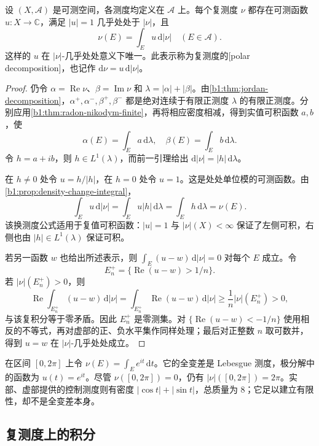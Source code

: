 \begin{theorem}[复测度的极分解]\label{b1:thm:complex-polar-decomposition}
设 \((X,\mathcal A)\) 是可测空间，各测度均定义在 \(\mathcal A\) 上。每个复测度 \(\nu\) 都存在可测函数 \(u:X\rightarrow\mathbb C\)，满足 \(|u|=1\) 几乎处处于 \(|\nu|\)，且
\[
\nu(E)=\int_Eu\,\mathrm d|\nu|\quad(E\in\mathcal A).
\]
这样的 \(u\) 在 \(|\nu|\)-几乎处处意义下唯一。此表示称为复测度的[polar decomposition]，也记作 \(\mathrm d\nu=u\,\mathrm d|\nu|\)。
\end{theorem}
\begin{proof}
仍令 \(\alpha=\operatorname{Re}\nu\)、\(\beta=\operatorname{Im}\nu\) 和 \(\lambda=|\alpha|+|\beta|\)。由\cref{b1:thm:jordan-decomposition}，\(\alpha^+,\alpha^-,\beta^+,\beta^-\) 都是绝对连续于有限正测度 \(\lambda\) 的有限正测度。分别应用\cref{b1:thm:radon-nikodym-finite}，再将相应密度相减，得到实值可积函数 \(a,b\)，使
\[
\alpha(E)=\int_Ea\,\mathrm d\lambda,\quad
\beta(E)=\int_Eb\,\mathrm d\lambda.
\]
令 \(h=a+ib\)，则 \(h\in L^1(\lambda)\)，而前一引理给出 \(\mathrm d|\nu|=|h|\,\mathrm d\lambda\)。

在 \(h\neq0\) 处令 \(u=h/|h|\)，在 \(h=0\) 处令 \(u=1\)。这是处处单位模的可测函数。由\cref{b1:prop:density-change-integral}，
\[
\int_Eu\,\mathrm d|\nu|
=\int_Eu|h|\,\mathrm d\lambda
=\int_Eh\,\mathrm d\lambda=\nu(E).
\]
该换测度公式适用于复值可积函数：\(|u|=1\) 与 \(|\nu|(X)<\infty\) 保证了左侧可积，右侧也由 \(|h|\in L^1(\lambda)\) 保证可积。

若另一函数 \(w\) 也给出所述表示，则 \(\int_E(u-w)\,\mathrm d|\nu|=0\) 对每个 \(E\) 成立。令
\[
E_n^+=\{\operatorname{Re}(u-w)>1/n\}.
\]
若 \(|\nu|(E_n^+)>0\)，则
\[
\operatorname{Re}\int_{E_n^+}(u-w)\,\mathrm d|\nu|
=\int_{E_n^+}\operatorname{Re}(u-w)\,\mathrm d|\nu|
\geq\frac1n|\nu|(E_n^+)>0,
\]
与该复积分等于零矛盾。因此 \(E_n^+\) 是零测集。对 \(\{\operatorname{Re}(u-w)<-1/n\}\) 使用相反的不等式，再对虚部的正、负水平集作同样处理；最后对正整数 \(n\) 取可数并，得到 \(u=w\) 在 \(|\nu|\)-几乎处处成立。
\end{proof}

在区间 \([0,2\pi]\) 上令 \(\nu(E)=\int_Ee^{it}\,\mathrm dt\)。它的全变差是 Lebesgue 测度，极分解中的函数为 \(u(t)=e^{it}\)。尽管 \(\nu([0,2\pi])=0\)，仍有 \(|\nu|([0,2\pi])=2\pi\)。实部、虚部提供的控制测度则有密度 \(|\cos t|+|\sin t|\)，总质量为 \(8\)；它足以建立有限性，却不是全变差本身。

\subsection{复测度上的积分}
\label{b1:subsec:060504}

